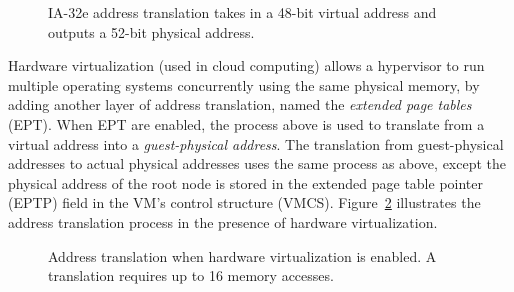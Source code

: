 \begin{figure}[hbtp]
  \caption{
    IA-32e address translation takes in a 48-bit virtual address and outputs
    a 52-bit physical address.
  }
  \label{fig:os_paging}
\end{figure}

Hardware virtualization (used in cloud computing) allows a hypervisor to run
multiple operating systems concurrently using the same physical memory, by
adding another layer of address translation, named the \textit{extended page
tables} (EPT). When EPT are enabled, the process above is used to translate
from a virtual address into a \textit{guest-physical address}. The translation
from guest-physical addresses to actual physical addresses uses the same
process as above, except the physical address of the root node is stored in the
extended page table pointer (EPTP) field in the VM's control structure (VMCS).
Figure~\ref{fig:vmx_paging} illustrates the address translation process in the
presence of hardware virtualization.

\begin{figure}[hbtp]
  \caption{
    Address translation when hardware virtualization is enabled. A translation
    requires up to 16 memory accesses.
  }
  \label{fig:vmx_paging}
\end{figure}


